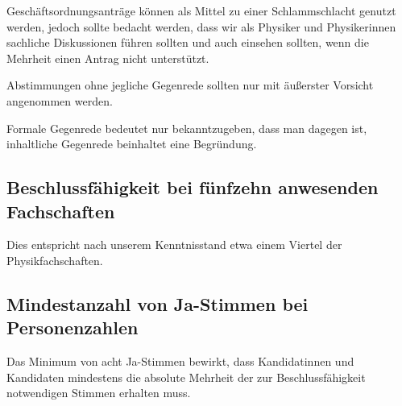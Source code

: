 \documentclass[draft,12pt,oneside]{scrreprt}
\begin{document}
Geschäftsordnungsanträge können als Mittel zu einer Schlammschlacht genutzt
werden, jedoch sollte bedacht werden, dass wir als Physiker und Physikerinnen
sachliche Diskussionen führen sollten und auch einsehen sollten, wenn die
Mehrheit einen Antrag nicht unterstützt.

Abstimmungen ohne jegliche Gegenrede sollten nur mit äußerster Vorsicht
angenommen werden.

Formale Gegenrede bedeutet nur bekanntzugeben, dass man dagegen ist, inhaltliche
Gegenrede beinhaltet eine Begründung.

\subsection*{Beschlussfähigkeit bei fünfzehn anwesenden Fachschaften}

Dies entspricht nach unserem Kenntnisstand etwa einem Viertel der Physikfachschaften.

\subsection*{Mindestanzahl von Ja-Stimmen bei Personenzahlen}

Das Minimum von acht Ja-Stimmen bewirkt, dass Kandidatinnen und Kandidaten
mindestens die absolute Mehrheit der zur Beschlussfähigkeit notwendigen Stimmen
erhalten muss.
\end{document}
